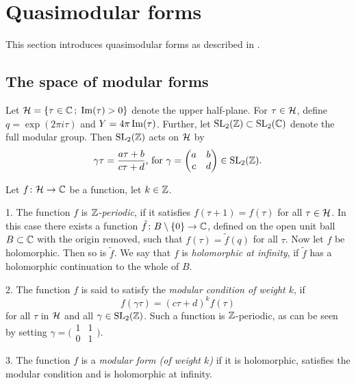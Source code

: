 \section{Quasimodular forms}

This section introduces quasimodular forms as described in \cite{Kaneko-Zagier1995}.

\subsection{The space of modular forms}

Let $\mathcal{H}=\{\tau \in \mathbb{C} \,;\; \operatorname{Im}(\tau)>0\}$ denote the upper half-plane. For $\tau \in \mathcal{H}$, define $q=\exp(2\pi i\tau)$ and $Y=4\pi\operatorname{Im}(\tau)$. Further, let $\operatorname{SL}_2(\mathbb{Z}) \subset \operatorname{SL}_2(\mathbb{C})$ denote the full modular group. Then $\operatorname{SL}_2(\mathbb{Z})$ acts \if\footnotemark\fi on $\mathcal{H}$ by 
\[\gamma\tau = \frac{a\tau + b}{c\tau + d}\text{, for }\gamma = 
\begin{pmatrix}
 a & b \\
 c & d
\end{pmatrix}
\in \operatorname{SL}_2(\mathbb{Z}). 
\]


\begin{defi} Let $f\colon \mathcal{H} \to \mathbb{C}$ be a function, let $k\in \mathbb{Z}$.

  1. The function $f$ is \emph{$\mathbb{Z}$-periodic}, if it satisfies $f(\tau + 1) = f(\tau)$ for all $\tau \in \mathcal{H}$. In this case there exists a  function $\tilde f\colon B\setminus \{0\} \to \mathbb{C}$, defined on the open unit ball $B\subset \mathbb{C}$ with the origin removed, such that $f(\tau)=\tilde f(q)$ for all $\tau$. Now let $f$ be holomorphic. Then so is $\tilde f$. We say that $f$ is \emph{holomorphic at infinity}, if $\tilde f$ has a holomorphic continuation to the whole of $B$.
  
  2. The function $f$ is said to satisfy the \emph{modular condition of weight $k$}, if \[f(\gamma\tau)=(c\tau+d)^kf(\tau)\] for all $\tau$ in $\mathcal{H}$ and all $\gamma \in \operatorname{SL}_2(\mathbb{Z})$. Such a function is $\mathbb{Z}$-periodic, as can be seen by setting $\gamma = 
\bigl(\begin{smallmatrix}
 1 & 1 \\
 0 & 1
\end{smallmatrix}\bigr).$
  
  3. The function $f$ is a \emph{modular form (of weight $k$)} if it is holomorphic, satisfies the modular condition and is holomorphic at infinity.
\end{defi}


